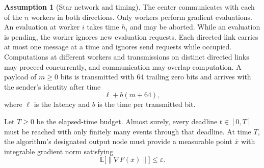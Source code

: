 \documentclass[10pt]{article}
\theoremstyle{definition}
\newtheorem{assumption}{Assumption}
\begin{document}
\begin{assumption}[Star network and timing]
The center communicates with each of the $n$ workers in both directions. Only workers perform gradient evaluations. An evaluation at worker $i$ takes time $h_i$ and may be aborted. While an evaluation is pending, the worker ignores new evaluation requests. Each directed link carries at most one message at a time and ignores send requests while occupied. Computations at different workers and transmissions on distinct directed links may proceed concurrently, and communication may overlap computation. A payload of $m\geq 0$ bits is transmitted with 64 trailing zero bits and arrives with the sender's identity after time
\[
\ell+b(m+64),
\]
where $\ell$ is the latency and $b$ is the time per transmitted bit.
\end{assumption}

Let $T\geq 0$ be the elapsed-time budget. Almost surely, every deadline $t\in[0,T]$ must be reached with only finitely many events through that deadline. At time $T$, the algorithm's designated output node must provide a measurable point $\bar{x}$ with integrable gradient norm satisfying
\[
\mathbb{E}\bigl[\|\nabla F(\bar{x})\|\bigr]\leq\varepsilon.
\]
\end{document}
